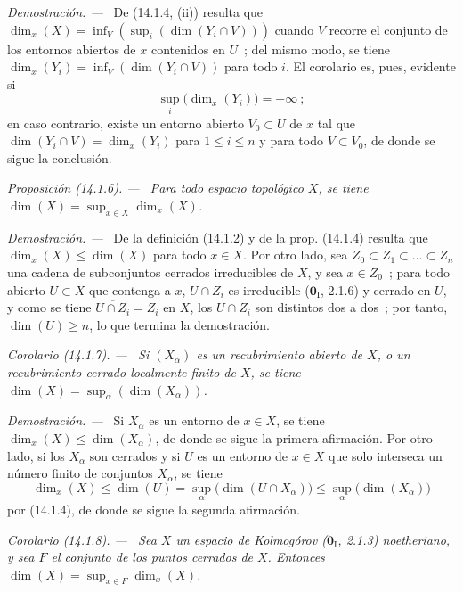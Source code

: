 \documentclass[10pt,oneside]{book}
\makeatletter
\newcommand{\setmanualcurrentlabel}[1]{\def\@currentlabel{#1}}
\newenvironment{proposition}[1][]{%
  \setmanualcurrentlabel{#1}\par\medskip\noindent\itshape Proposición (#1). ---\ }{\par}
\newenvironment{corollary}[1][]{%
  \setmanualcurrentlabel{#1}\par\medskip\noindent\itshape Corolario (#1). ---\ }{\par}
\newenvironment{proof}{%
  \par\medskip\noindent\textit{Demostración. ---\ }}{\par}
\makeatother
\begin{document}
\begin{proof}
De (14.1.4, (ii)) resulta que
$\dim_x(X)=\inf_V(\sup_i(\dim(Y_i\cap V)))$ cuando $V$ recorre el conjunto
de los entornos abiertos de $x$ contenidos en $U$~; del mismo modo, se tiene
$\dim_x(Y_i)=\inf_V(\dim(Y_i\cap V))$ para todo $i$. El corolario es, pues,
evidente si
\[
  \sup_i\bigl(\dim_x(Y_i)\bigr)=+\infty~;
\]
en caso contrario, existe un entorno abierto $V_0\subset U$ de $x$ tal
que $\dim(Y_i\cap V)=\dim_x(Y_i)$ para $1\leq i\leq n$ y para todo
$V\subset V_0$, de donde se sigue la conclusión.
\end{proof}

\begin{proposition}[14.1.6]
\label{0.14.1.6-es}
Para todo espacio topológico $X$, se tiene
$\dim(X)=\sup_{x\in X}\dim_x(X)$.
\end{proposition}

\begin{proof}
De la definición (14.1.2) y de la prop. (14.1.4) resulta que
$\dim_x(X)\leq\dim(X)$ para todo $x\in X$. Por otro lado, sea
$Z_0\subset Z_1\subset\ldots\subset Z_n$ una cadena de subconjuntos cerrados
irreducibles de $X$, y sea $x\in Z_0$~; para todo abierto $U\subset X$
que contenga a $x$, $U\cap Z_i$ es irreducible ($\mathbf{0}_{\mathrm I}$, 2.1.6) y
cerrado en $U$, y como se tiene $\overline{U\cap Z_i}=Z_i$ en $X$, los
$U\cap Z_i$ son distintos dos a dos~; por tanto, $\dim(U)\geq n$, lo que
termina la demostración.
\end{proof}

\begin{corollary}[14.1.7]
\label{0.14.1.7-es}
Si $(X_\alpha)$ es un recubrimiento abierto de $X$, o un recubrimiento cerrado
localmente finito de $X$, se tiene
$\dim(X)=\sup_\alpha(\dim(X_\alpha))$.
\end{corollary}

\begin{proof}
Si $X_\alpha$ es un entorno de $x\in X$, se tiene
$\dim_x(X)\leq\dim(X_\alpha)$, de donde se sigue la primera afirmación. Por otro
lado, si los $X_\alpha$ son cerrados y si $U$ es un entorno de $x\in X$ que
solo interseca un número finito de conjuntos $X_\alpha$, se tiene
\[
  \dim_x(X)\leq\dim(U)=\sup_\alpha\bigl(\dim(U\cap X_\alpha)\bigr)
  \leq\sup_\alpha\bigl(\dim(X_\alpha)\bigr)
\]
por (14.1.4), de donde se sigue la segunda afirmación.
\end{proof}

\begin{corollary}[14.1.8]
\label{0.14.1.8-es}
Sea $X$ un espacio de Kolmogórov \textup{($\mathbf 0_{\mathrm I}$, 2.1.3)} noetheriano, y
sea $F$ el conjunto de los puntos cerrados de $X$. Entonces
$\dim(X)=\sup_{x\in F}\dim_x(X)$.
\end{corollary}
\end{document}
